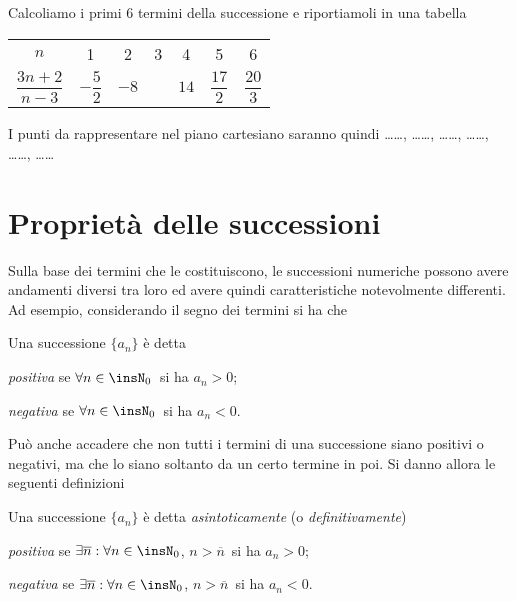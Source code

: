 \begin{exrig}
\begin{esempio}
Calcoliamo i primi 6 termini della successione e riportiamoli in una tabella
\begin{center}
\begin{tabular} {*{7}{c}}
\toprule
$n$ & 1 & 2 & 3 & 4 & 5 & 6\\
$\dfrac{3n+2}{n-3}$ & $-\dfrac{5}{2}$ & $-8$ & & $14$ & $\dfrac{17}{2}$ & $\dfrac{20}{3}$\\
\bottomrule
\end{tabular}
\end{center}
I punti da rappresentare nel piano cartesiano saranno quindi \ldots\ldots, \ldots\ldots, \ldots\ldots, \ldots\ldots, \ldots\ldots, \ldots\ldots
\begin{center}
 
\end{center}
\end{esempio}
\end{exrig}
\vspazio\ovalbox{\risolvii \ref{ese:8a_succ.1}, \ref{ese:8a_succ.2}, \ref{ese:8a_succ.3}, \ref{ese:8a_succ.4}, \ref{ese:8a_succ.5}, \ref{ese:8a_succ.6}, \ref{ese:8a_succ.7}, \ref{ese:8a_succ.8}, \ref{ese:8a_succ.9}}


\section{Proprietà delle successioni}

Sulla base dei termini che le costituiscono, le successioni numeriche possono avere andamenti diversi tra loro ed avere quindi caratteristiche notevolmente differenti. Ad esempio, considerando il segno dei termini si ha che

\begin{definizione}
Una successione $\{a_n\}$ è detta
\begin{itemize*}
\item \emph{positiva} se $\forall n\in\insN_0\,$ si ha $a_n>0$;
\item \emph{negativa} se $\forall n\in\insN_0\,$ si ha $a_n<0$.
\end{itemize*} 
\end{definizione}

Può anche accadere che non tutti i termini di una successione siano positivi o negativi, ma che lo siano soltanto da un certo termine in poi. Si danno allora le seguenti definizioni

\begin{definizione}
Una successione $\{a_n\}$ è detta \emph{asintoticamente} (o \emph{definitivamente})
\begin{itemize*}
\item \emph{positiva} se $\exists \overline{n} : \forall n \in\insN_0$, $n > \overline{n}\,$ si ha $a_n>0$;
\item \emph{negativa} se $\exists \overline{n} : \forall n \in\insN_0$, $n > \overline{n}\,$ si ha $a_n<0$.
\end{itemize*} 
\end{definizione}

